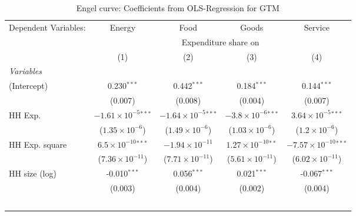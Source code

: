 
\begin{table}[htbp!]
   \centering
   \small
   \begin{adjustbox}{width = 1\textwidth, max height = 0.95\textheight, center}
      \begin{threeparttable}[b]
         \caption{\label{tab:Engel_parametric_GTM} Engel curve: Coefficients from OLS-Regression for GTM}
         \begin{tabular}{lcccc}
            \tabularnewline \midrule \midrule
            Dependent Variables: & Energy                         & Food                           & Goods                         & Service\\  
             & \multicolumn{4}{c}{Expenditure share on} \\ 
                                 & (1)                            & (2)                            & (3)                           & (4)\\  
            \midrule
            \emph{Variables}\\
            (Intercept)          & 0.230$^{***}$                  & 0.442$^{***}$                  & 0.184$^{***}$                 & 0.144$^{***}$\\   
                                 & (0.007)                        & (0.008)                        & (0.004)                       & (0.007)\\   
            HH Exp.              & $-1.61\times 10^{-5}$$^{***}$  & $-1.64\times 10^{-5}$$^{***}$  & $-3.8\times 10^{-6}$$^{***}$  & $3.64\times 10^{-5}$$^{***}$\\    
                                 & ($1.35\times 10^{-6}$)         & ($1.49\times 10^{-6}$)         & ($1.03\times 10^{-6}$)        & ($1.2\times 10^{-6}$)\\    
            HH Exp. square       & $6.5\times 10^{-10}$$^{***}$   & $-1.94\times 10^{-11}$         & $1.27\times 10^{-10}$$^{**}$  & $-7.57\times 10^{-10}$$^{***}$\\    
                                 & ($7.36\times 10^{-11}$)        & ($7.71\times 10^{-11}$)        & ($5.61\times 10^{-11}$)       & ($6.02\times 10^{-11}$)\\    
            HH size (log)        & -0.010$^{***}$                 & 0.056$^{***}$                  & 0.021$^{***}$                 & -0.067$^{***}$\\   
                                 & (0.003)                        & (0.004)                        & (0.002)                       & (0.004)\\   
$$
\end{tabular}
\end{threeparttable}
\end{adjustbox}
\end{table}
